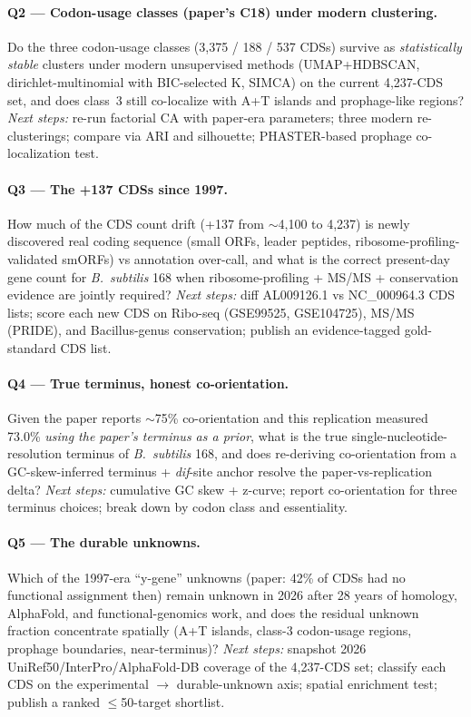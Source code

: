 \documentclass[11pt,letterpaper]{article}
\begin{document}
\paragraph{Q2 --- Codon-usage classes (paper's C18) under modern clustering.}
Do the three codon-usage classes (3,375 / 188 / 537 CDSs) survive as \emph{statistically stable} clusters under modern unsupervised methods (UMAP+HDBSCAN, dirichlet-multinomial with BIC-selected K, SIMCA) on the current 4,237-CDS set, and does class~3 still co-localize with A+T islands and prophage-like regions?
\textit{Next steps:} re-run factorial CA with paper-era parameters; three modern re-clusterings; compare via ARI and silhouette; PHASTER-based prophage co-localization test.

\paragraph{Q3 --- The +137 CDSs since 1997.}
How much of the CDS count drift (+137 from $\sim$4,100 to 4,237) is newly discovered real coding sequence (small ORFs, leader peptides, ribosome-profiling-validated smORFs) vs annotation over-call, and what is the correct present-day gene count for \textit{B.~subtilis} 168 when ribosome-profiling + MS/MS + conservation evidence are jointly required?
\textit{Next steps:} diff AL009126.1 vs NC\_000964.3 CDS lists; score each new CDS on Ribo-seq (GSE99525, GSE104725), MS/MS (PRIDE), and Bacillus-genus conservation; publish an evidence-tagged gold-standard CDS list.

\paragraph{Q4 --- True terminus, honest co-orientation.}
Given the paper reports $\sim$75\% co-orientation and this replication measured 73.0\% \emph{using the paper's terminus as a prior}, what is the true single-nucleotide-resolution terminus of \textit{B.~subtilis} 168, and does re-deriving co-orientation from a GC-skew-inferred terminus + \textit{dif}-site anchor resolve the paper-vs-replication delta?
\textit{Next steps:} cumulative GC skew + z-curve; report co-orientation for three terminus choices; break down by codon class and essentiality.

\paragraph{Q5 --- The durable unknowns.}
Which of the 1997-era ``y-gene'' unknowns (paper: 42\% of CDSs had no functional assignment then) remain unknown in 2026 after 28 years of homology, AlphaFold, and functional-genomics work, and does the residual unknown fraction concentrate spatially (A+T islands, class-3 codon-usage regions, prophage boundaries, near-terminus)?
\textit{Next steps:} snapshot 2026 UniRef50/InterPro/AlphaFold-DB coverage of the 4,237-CDS set; classify each CDS on the experimental $\rightarrow$ durable-unknown axis; spatial enrichment test; publish a ranked $\leq$50-target shortlist.
\end{document}
